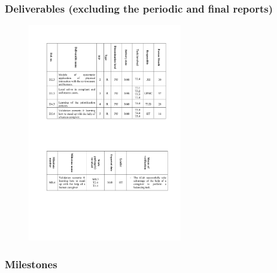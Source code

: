 \documentclass[12pt,a4paper,twoside]{article}
\begin{document}
\subsubsection{Deliverables (excluding the periodic and final reports)}

\begin{figure}
\centering
\includegraphics[width=0.6\textwidth]{./images/deliverables.pdf}
\end{figure}

\subsubsection{Milestones}
\end{document}

